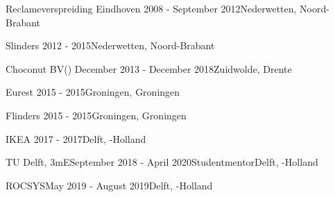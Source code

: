 \begin{rSection}{}
  \begin{experienceItem}
    {Reclameverspreiding Eindhoven}{ 2008 - September 2012}{}{Nederwetten, Noord-Brabant}
  \end{experienceItem}

  \begin{experienceItem}
    {Slinders}{ 2012 -  2015}{{}}{Nederwetten, Noord-Brabant}
  \end{experienceItem}

  \begin{experienceItem}
    {Choconut BV}{() December 2013 - December 2018}{}{Zuidwolde, Drente}
  \end{experienceItem}

  \newpage
  \begin{experienceItem}
    {Eurest}{ 2015 -  2015}{}{Groningen, Groningen}
  \end{experienceItem}

  \begin{experienceItem}
    {Flinders}{ 2015 -  2015}{}{Groningen, Groningen}
  \end{experienceItem}

  \begin{experienceItem}
    {IKEA}{ 2017 -  2017}{}{Delft, -Holland}
  \end{experienceItem}

  \begin{experienceItem}
    {TU Delft, 3mE}{September 2018 - April 2020}{Studentmentor}{Delft, -Holland}
  \end{experienceItem}

  \begin{experienceItem}
    {ROCSYS}{May 2019 - August 2019}{}{Delft, -Holland}
  \end{experienceItem}


\end{rSection}
